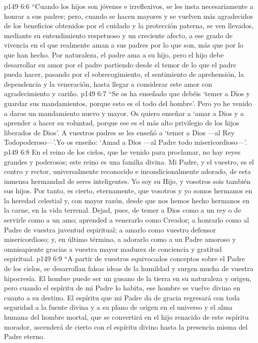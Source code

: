 \vs p149 6:6 “Cuando los hijos son jóvenes e irreflexivos, se les insta necesariamente a honrar a sus padres; pero, cuando se hacen mayores y se vuelven más agradecidos de los beneficios obtenidos por el cuidado y la protección paterna, se ven llevados, mediante su entendimiento respetuoso y un creciente afecto, a ese grado de vivencia en el que realmente aman a sus padres por lo que son, más que por lo que han hecho. Por naturaleza, el padre ama a su hijo, pero el hijo debe desarrollar su amor por el padre partiendo desde el temor de lo que el padre pueda hacer, pasando por el sobrecogimiento, el sentimiento de aprehensión, la dependencia y la veneración, hasta llegar a considerar este amor con agradecimiento y cariño.
\vs p149 6:7 “Se os ha enseñado que debéis ‘temer a Dios y guardar sus mandamientos, porque esto es el todo del hombre’. Pero yo he venido a daros un mandamiento nuevo y mayor. Os quiero enseñar a ‘amar a Dios y a aprender a hacer su voluntad, porque ese es el más alto privilegio de los hijos liberados de Dios’. A vuestros padres se les enseñó a ‘temer a Dios ---al Rey Todopoderoso---’.Yo os enseño: ‘Amad a Dios ---al Padre todo misericordioso---’.
\vs p149 6:8 En el reino de los cielos, que he venido para proclamar, no hay reyes grandes y poderosos; este reino es una familia divina. Mi Padre, y el vuestro, es el centro y rector, universalmente reconocido e incondicionalmente adorado, de esta inmensa hermandad de seres inteligentes. Yo soy su Hijo, y vosotros sois también sus hijos. Por tanto, es cierto, eternamente, que vosotros y yo somos hermanos en la heredad celestial y, con mayor razón, desde que nos hemos hecho hermanos en la carne, en la vida terrenal. Dejad, pues, de temer a Dios como a un rey o de servirle como a un amo; aprended a venerarlo como Creador; a honrarlo como al Padre de vuestra juventud espiritual; a amarlo como vuestro defensor misericordioso; y, en último término, a adorarlo como a un Padre amoroso y omnisapiente gracias a vuestra mayor madurez de conciencia y gratitud espiritual.
\vs p149 6:9 “A partir de vuestros equivocados conceptos sobre el Padre de los cielos, se desarrollan falsas ideas de la humildad y surgen mucha de vuestra hipocresía. El hombre puede ser un gusano de la tierra en su naturaleza y origen, pero cuando el espíritu de mi Padre lo habita, ese hombre se vuelve divino en cuanto a su destino. El espíritu que mi Padre da de gracia regresará con toda seguridad a la fuente divina y a su plano de origen en el universo y el alma humana del hombre mortal, que se convertirá en el hijo renacido de este espíritu morador, ascenderá de cierto con el espíritu divino hasta la presencia misma del Padre eterno.
